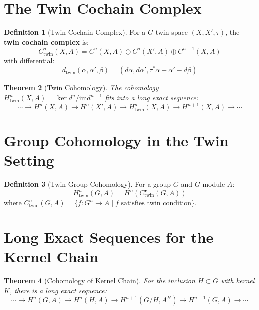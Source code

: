 \documentclass[11pt,a4paper,openright]{book}
\theoremstyle{plain}
\newtheorem{theorem}{Theorem}[chapter]
\theoremstyle{definition}
\newtheorem{definition}[theorem]{Definition}
\newcommand{\im}{\mathrm{im}}
\begin{document}
\section{The Twin Cochain Complex}

\begin{definition}[Twin Cochain Complex]
For a $G$-twin space $(X, X', \tau)$, the \textbf{twin cochain complex} is:
\begin{equation}
C^n_{\mathrm{twin}}(X, A) = C^n(X, A) \oplus C^n(X', A) \oplus C^{n-1}(X, A)
\end{equation}
with differential:
\begin{equation}
d_{\mathrm{twin}}(\alpha, \alpha', \beta) = (d\alpha, d\alpha', \tau^*\alpha - \alpha' - d\beta)
\end{equation}
\end{definition}

\begin{theorem}[Twin Cohomology]
The cohomology $H^n_{\mathrm{twin}}(X, A) = \ker d^n / \im d^{n-1}$ fits into a long exact sequence:
\begin{equation}
\cdots \to H^n(X, A) \to H^n(X', A) \to H^n_{\mathrm{twin}}(X, A) \to H^{n+1}(X, A) \to \cdots
\end{equation}
\end{theorem}

\section{Group Cohomology in the Twin Setting}

\begin{definition}[Twin Group Cohomology]
For a group $G$ and $G$-module $A$:
\begin{equation}
H^n_{\mathrm{twin}}(G, A) = H^n(C^\bullet_{\mathrm{twin}}(G, A))
\end{equation}
where $C^n_{\mathrm{twin}}(G, A) = \{f: G^n \to A \mid f \text{ satisfies twin condition}\}$.
\end{definition}

\section{Long Exact Sequences for the Kernel Chain}

\begin{theorem}[Cohomology of Kernel Chain]
For the inclusion $H \subset G$ with kernel $K$, there is a long exact sequence:
\begin{equation}
\cdots \to H^n(G, A) \to H^n(H, A) \to H^{n+1}(G/H, A^H) \to H^{n+1}(G, A) \to \cdots
\end{equation}
\end{theorem}
\end{document}
